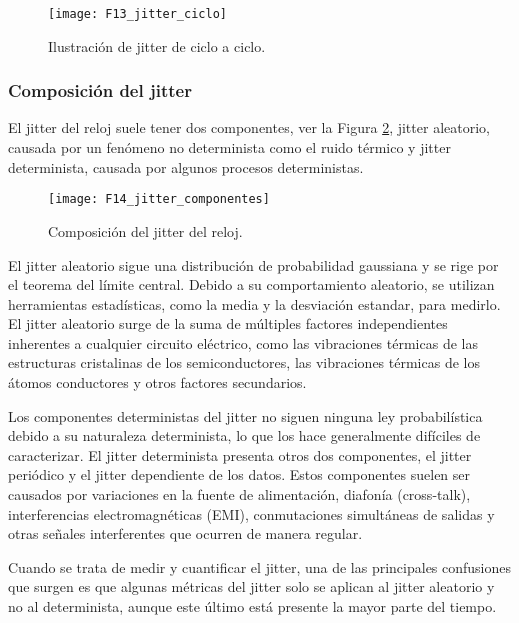                 \begin{figure}[hbtp]
                    \centering
                    \texttt{[image: F13\_jitter\_ciclo]}
                    \caption{Ilustración de jitter de ciclo a ciclo.}
                    \label{fig:F13_jitter_ciclo}
                \end{figure}

            \subsubsection{Composición del jitter}

                El jitter del reloj suele tener dos componentes, ver la Figura \ref{fig:F14_jitter_componentes}, jitter aleatorio, causada por un fenómeno no determinista como el ruido térmico y jitter determinista, causada por algunos procesos deterministas.

                \begin{figure}[hbtp]
                    \centering
                    \texttt{[image: F14\_jitter\_componentes]}
                    \caption{Composición del jitter del reloj.}
                    \label{fig:F14_jitter_componentes}
                \end{figure}

                El jitter aleatorio sigue una distribución de probabilidad gaussiana y se rige por el teorema del límite central. Debido a su comportamiento aleatorio, se utilizan herramientas estadísticas, como la media y la desviación estandar, para medirlo. El jitter aleatorio surge de la suma de múltiples factores independientes inherentes a cualquier circuito eléctrico, como las vibraciones térmicas de las estructuras cristalinas de los semiconductores, las vibraciones térmicas de los átomos conductores y otros factores secundarios.

                Los componentes deterministas del jitter no siguen ninguna ley probabilística debido a su naturaleza determinista, lo que los hace generalmente difíciles de caracterizar. El jitter determinista presenta otros dos componentes, el jitter periódico y el jitter dependiente de los datos. Estos componentes suelen ser causados por variaciones en la fuente de alimentación, diafonía (cross-talk), interferencias electromagnéticas (EMI), conmutaciones simultáneas de salidas y otras señales interferentes que ocurren de manera regular.

                Cuando se trata de medir y cuantificar el jitter, una de las principales confusiones que surgen es que algunas métricas del jitter solo se aplican al jitter aleatorio y no al determinista, aunque este último está presente la mayor parte del tiempo.

